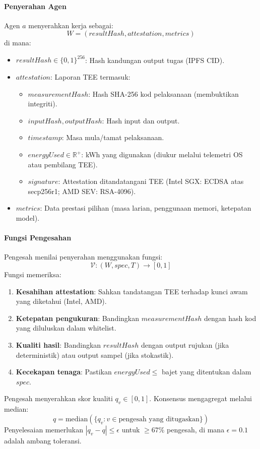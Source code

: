 \documentclass[11pt]{article}
\begin{document}
\paragraph{Penyerahan Agen} Agen $a$ menyerahkan kerja sebagai:
\begin{equation}
W = (resultHash, attestation, metrics)
\end{equation}
di mana:
\begin{itemize}[noitemsep]
  \item $resultHash \in \{0,1\}^{256}$: Hash kandungan output tugas (IPFS CID).
  \item $attestation$: Laporan TEE termasuk:
    \begin{itemize}[noitemsep]
      \item $measurementHash$: Hash SHA-256 kod pelaksanaan (membuktikan integriti).
      \item $inputHash, outputHash$: Hash input dan output.
      \item $timestamp$: Masa mula/tamat pelaksanaan.
      \item $energyUsed \in \mathbb{R}^+$: kWh yang digunakan (diukur melalui telemetri OS atau pembilang TEE).
      \item $signature$: Attestation ditandatangani TEE (Intel SGX: ECDSA atas secp256r1; AMD SEV: RSA-4096).
    \end{itemize}
  \item $metrics$: Data prestasi pilihan (masa larian, penggunaan memori, ketepatan model).
\end{itemize}

\paragraph{Fungsi Pengesahan} Pengesah menilai penyerahan menggunakan fungsi:
\begin{equation}
\mathcal{V}: (W, spec, T) \rightarrow [0, 1]
\end{equation}
Fungsi memeriksa:
\begin{enumerate}[noitemsep]
  \item \textbf{Kesahihan attestation}: Sahkan tandatangan TEE terhadap kunci awam yang diketahui (Intel, AMD).
  \item \textbf{Ketepatan pengukuran}: Bandingkan $measurementHash$ dengan hash kod yang diluluskan dalam whitelist.
  \item \textbf{Kualiti hasil}: Bandingkan $resultHash$ dengan output rujukan (jika deterministik) atau output sampel (jika stokastik).
  \item \textbf{Kecekapan tenaga}: Pastikan $energyUsed \leq$ bajet yang ditentukan dalam $spec$.
\end{enumerate}
Pengesah menyerahkan skor kualiti $q_v \in [0,1]$. Konsensus mengagregat melalui median:
\begin{equation}
q = \text{median}(\{q_v : v \in \text{pengesah yang ditugaskan}\})
\end{equation}
Penyelesaian memerlukan $|q_v - q| \leq \epsilon$ untuk $\geq 67\%$ pengesah, di mana $\epsilon = 0.1$ adalah ambang toleransi.
\end{document}
